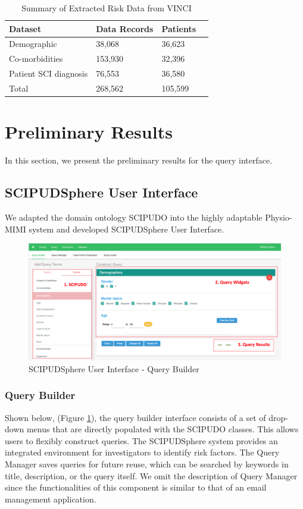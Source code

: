 \documentclass{amia}
\begin{document}
\begin{table}[!ht]
\centering
\caption{Summary of Extracted Risk Data from VINCI}
  \begin{tabular}{|l|l|l|l|}
  \hline
    \textbf{Dataset}  & \textbf{Data Records} & \textbf{Patients} \\ \hline
    Demographic            &  38,068  & 36,623 \\ \hline
    Co-morbidities         & 153,930  & 32,396 \\ \hline
    Patient SCI diagnosis  &  76,553  & 36,580 \\ \hline
    Total & 268,562 & 105,599 \\ \hline
  \end{tabular}
\end{table}

\section{Preliminary Results}
In this section, we present the preliminary results for the query interface. 

\subsection{SCIPUDSphere User Interface}
We adapted the domain ontology SCIPUDO into the highly adaptable Physio-MIMI system and developed SCIPUDSphere User Interface. 

\begin{figure}[h!]
  \centering
  \includegraphics[scale=0.4]{pics/interface.png}
  \caption{SCIPUDSphere User Interface - Query Builder}
  \label{interface}
\end{figure}

\subsubsection{Query Builder}
Shown below, (Figure \ref{interface}), the query builder interface consists of a set of drop-down menus that are directly populated with the SCIPUDO classes. This allows users to flexibly construct queries. The SCIPUDSphere system provides an integrated environment for investigators to identify risk factors. The Query Manager saves queries for future reuse, which can be searched by keywords in title, description, or the query itself. We omit the description of Query Manager since the functionalities of this component is similar to that of an email management application.
\end{document}
